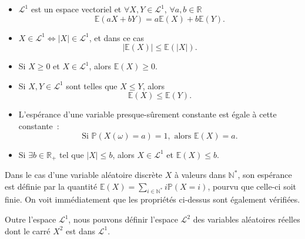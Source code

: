 \begin{proposition}\label{II-propl1}

\begin{itemize}
\tightlist
\item
  \(\mathcal{L}^1\) est un espace vectoriel et
  \(\forall X,Y \in \mathcal{L}^1\), \(\forall a,b \in \mathbb{R}\)
  \[\mathbb{E}(aX + bY) = a\mathbb{E}(X) + b\mathbb{E}(Y).\]
\item
  \(X \in \mathcal{L}^1 \Leftrightarrow |X| \in \mathcal{L}^1\), et dans
  ce cas \[|\mathbb{E}(X)| \leq \mathbb{E}(|X|).\]
\item
  Si \(X \geq 0\) et \(X \in \mathcal{L}^1\), alors
  \(\mathbb{E}(X) \geq 0.\)
\item
  Si \(X,Y \in \mathcal{L}^1\) sont telles que \(X \leq Y\), alors
  \[ \mathbb{E}(X) \leq \mathbb{E}(Y).\]
\item
  L'espérance d'une variable presque-sûrement constante est égale à
  cette constante~:
  \[ \text{Si } \mathbb{P}(X(\omega) = a ) = 1, \text{ alors } \mathbb{E}(X) = a.\]
\item
  Si \(\exists b \in \mathbb{R}_+\) tel que \(|X| \leq b\), alors
  \(X \in \mathcal{L}^1\) et \(\mathbb{E}(X) \leq b\).
\end{itemize}
\end{proposition}

\label{II-basics}

\begin{remarque}\label{II-rappel-cas-discret}
Dans le cas d'une variable aléatoire discrète \(X\) à valeurs dans
\(\mathbb{N}^\ast\), son espérance est définie par la quantité
\(\mathbb{E}(X) = \sum_{i\in\mathbb{N}^\ast} i\mathbb{P}(X=i)\), pourvu
que celle-ci soit finie. On voit immédiatement que les propriétés
ci-dessus sont également vérifiées.
\end{remarque}

Outre l'espace \(\mathcal{L}^1\), nous pouvons définir l'espace
\(\mathcal{L}^2\) des variables aléatoires réelles dont le carré \(X^2\)
est dans \(\mathcal{L}^1\).

